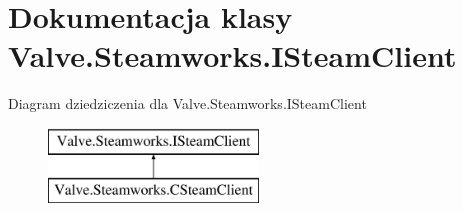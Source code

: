 \hypertarget{class_valve_1_1_steamworks_1_1_i_steam_client}{}\section{Dokumentacja klasy Valve.\+Steamworks.\+I\+Steam\+Client}
\label{class_valve_1_1_steamworks_1_1_i_steam_client}
Diagram dziedziczenia dla Valve.\+Steamworks.\+I\+Steam\+Client\begin{figure}[H]
\begin{center}
\leavevmode
\includegraphics[height=2.000000cm]{class_valve_1_1_steamworks_1_1_i_steam_client}
\end{center}
\end{figure}
